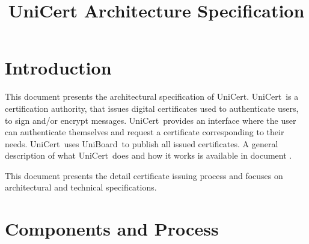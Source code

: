 \documentclass[oneside]{scrreprt}
\newcommand{\uniboard}{\mbox{UniBoard}}
\newcommand{\unicert}{\mbox{UniCert}}
\begin{document}
\lstset{
  language=Java,
  basicstyle=\footnotesize\sffamily, %
  keywordstyle=\bfseries,
  numbers=right
}

\title{UniCert Architecture Specification}
\maketitle

\begin{versionhistory}
\end{versionhistory}




\tableofcontents

\chapter{Introduction}

This document presents the architectural specification of \unicert. \unicert\ is a certification authority, that issues digital certificates used to authenticate users, to sign and/or encrypt messages. \unicert\ provides an interface where the user can authenticate themselves and request a certificate corresponding to their needs. \unicert\ uses \uniboard\ to publish all issued certificates. A general description of what \unicert\ does and how it works is available in document \cite{univote_spec}. 

This document presents the detail certificate issuing process and focuses on architectural and technical specifications. 

\chapter{Components and Process}
\end{document}
